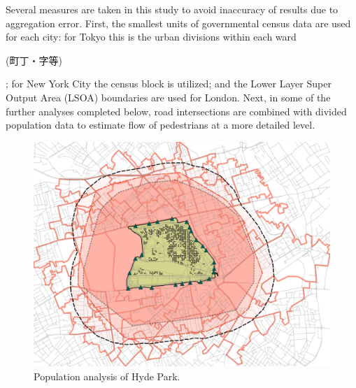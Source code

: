 \begin{multicols}{2}
Several measures are taken in this study to avoid inaccuracy of results due to aggregation error. First, the smallest units of governmental census data are used for each city: for Tokyo this is the urban divisions within each ward \begin{CJK}{UTF8}{min}(町丁・字等)\end{CJK}; for New York City the census block is utilized; and the Lower Layer Super Output Area (LSOA) boundaries are used for London. Next, in some of the further analyses completed below, road intersections are combined with divided population data to estimate flow of pedestrians at a more detailed level. 

\end{multicols}

\begin{figure}[ht]
  \centering
  \captionsetup{width=1.0\textwidth}
  \includegraphics[width=1.0\textwidth]{images/network/hyde_approx_pop.png}\par
  \caption[Hyde Park - population]{Population analysis of Hyde Park.}
  \label{fig:hyde_1km_pop}
\end{figure}

